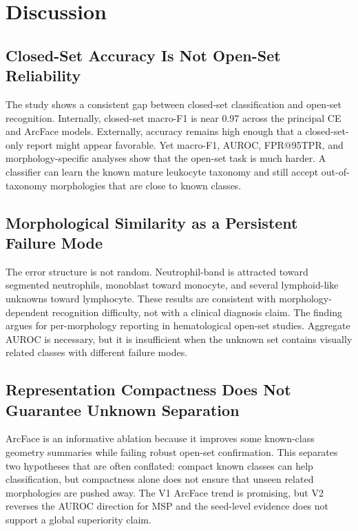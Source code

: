 \section{Discussion}

\subsection{Closed-Set Accuracy Is Not Open-Set Reliability}

The study shows a consistent gap between closed-set classification and open-set recognition. Internally, closed-set macro-F1 is near 0.97 across the principal CE and ArcFace models. Externally, accuracy remains high enough that a closed-set-only report might appear favorable. Yet macro-F1, AUROC, FPR@95TPR, and morphology-specific analyses show that the open-set task is much harder. A classifier can learn the known mature leukocyte taxonomy and still accept out-of-taxonomy morphologies that are close to known classes.

\subsection{Morphological Similarity as a Persistent Failure Mode}

The error structure is not random. Neutrophil-band is attracted toward segmented neutrophils, monoblast toward monocyte, and several lymphoid-like unknowns toward lymphocyte. These results are consistent with morphology-dependent recognition difficulty, not with a clinical diagnosis claim. The finding argues for per-morphology reporting in hematological open-set studies. Aggregate AUROC is necessary, but it is insufficient when the unknown set contains visually related classes with different failure modes.

\subsection{Representation Compactness Does Not Guarantee Unknown Separation}

ArcFace is an informative ablation because it improves some known-class geometry summaries while failing robust open-set confirmation. This separates two hypotheses that are often conflated: compact known classes can help classification, but compactness alone does not ensure that unseen related morphologies are pushed away. The V1 ArcFace trend is promising, but V2 reverses the AUROC direction for MSP and the seed-level evidence does not support a global superiority claim.

